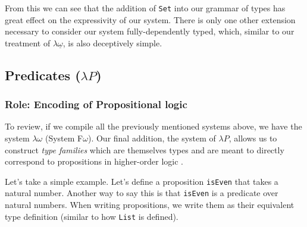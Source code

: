 \documentclass[12pt]{article}
\begin{document}
From this we can see that the addition of {\tt Set} into our grammar of
types has great effect on the expressivity of our system. There is only one
other extension necessary to consider our system fully-dependently typed, which,
similar to our treatment of \(\lambda\underline{\omega}\), is also deceptively
simple.

\subsection*{Predicates (\(\lambda P\))}
\subsubsection*{Role: Encoding of Propositional logic}

To review, if we compile all the previously mentioned systems above, we have
the system \(\lambda\omega\) (System F\(\omega\)). Our final addition, the
system of \(\lambda P\), allows us to construct {\em type families} which are
themselves types and are meant to directly correspond to propositions in
higher-order logic \cite{}.

Let's take a simple example. Let's define a proposition {\tt isEven} that takes
a natural number. Another way to say this is that {\tt isEven} is a predicate
over natural numbers. When writing propositions, we write them as their equivalent
type definition (similar to how {\tt List} is defined).
\end{document}

